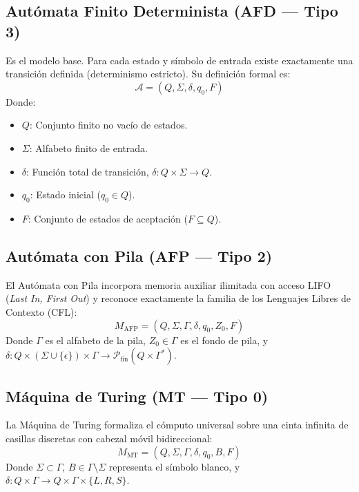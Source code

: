 \documentclass[12pt,letterpaper]{article}
\begin{document}
\subsection{Autómata Finito Determinista (AFD — Tipo 3)}
Es el modelo base. Para cada estado y símbolo de entrada existe exactamente una transición definida (determinismo estricto). Su definición formal es:
\begin{equation}
\mathcal{A} = (Q, \Sigma, \delta, q_0, F)
\end{equation}
Donde:
\begin{itemize}
    \item $Q$: Conjunto finito no vacío de estados.
    \item $\Sigma$: Alfabeto finito de entrada.
    \item $\delta$: Función total de transición, $\delta : Q \times \Sigma \to Q$.
    \item $q_0$: Estado inicial ($q_0 \in Q$).
    \item $F$: Conjunto de estados de aceptación ($F \subseteq Q$).
\end{itemize}

\subsection{Autómata con Pila (AFP — Tipo 2)}
El Autómata con Pila incorpora memoria auxiliar ilimitada con acceso LIFO (\textit{Last In, First Out}) y reconoce exactamente la familia de los Lenguajes Libres de Contexto (CFL):
\begin{equation}
M_{\text{AFP}} = (Q, \Sigma, \Gamma, \delta, q_0, Z_0, F)
\end{equation}
Donde $\Gamma$ es el alfabeto de la pila, $Z_0 \in \Gamma$ es el fondo de pila, y $\delta : Q \times (\Sigma \cup \{\epsilon\}) \times \Gamma \to \mathcal{P}_{\text{fin}}(Q \times \Gamma^*)$.

\subsection{Máquina de Turing (MT — Tipo 0)}
La Máquina de Turing formaliza el cómputo universal sobre una cinta infinita de casillas discretas con cabezal móvil bidireccional:
\begin{equation}
M_{\text{MT}} = (Q, \Sigma, \Gamma, \delta, q_0, B, F)
\end{equation}
Donde $\Sigma \subset \Gamma$, $B \in \Gamma \setminus \Sigma$ representa el símbolo blanco, y $\delta : Q \times \Gamma \to Q \times \Gamma \times \{L, R, S\}$.
\end{document}
